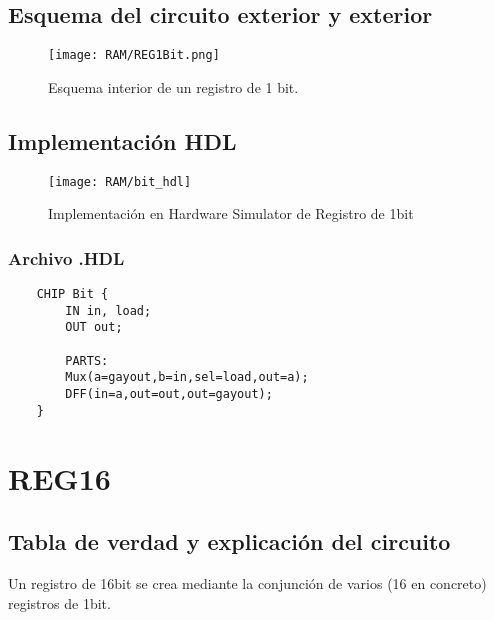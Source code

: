 \documentclass[12pt]{article}
\begin{document}
	\subsection{Esquema del circuito exterior y exterior}
	\begin{figure}[H]
	\centering
	\texttt{[image: RAM/REG1Bit.png]}
	\caption{Esquema interior de un registro de 1 bit.}
	\label{fig:reg1bit}
	\end{figure}
	\subsection{Implementación HDL}
	\begin{figure}[H]
	\centering
	\texttt{[image: RAM/bit\_hdl]}
	\caption{Implementación en Hardware Simulator de Registro de 1bit}
	\label{fig:bithdl}
	\end{figure}
	\subsubsection{Archivo .HDL}
	\begin{lstlisting}
	CHIP Bit {
		IN in, load;
		OUT out;

		PARTS:
		Mux(a=gayout,b=in,sel=load,out=a);
		DFF(in=a,out=out,out=gayout);
	}
	\end{lstlisting}

	\newpage
	\section{REG16}
	\subsection{Tabla de verdad y explicación del circuito}
	Un registro de 16bit se crea mediante la conjunción de varios (16 en concreto) registros de 1bit.
\end{document}
